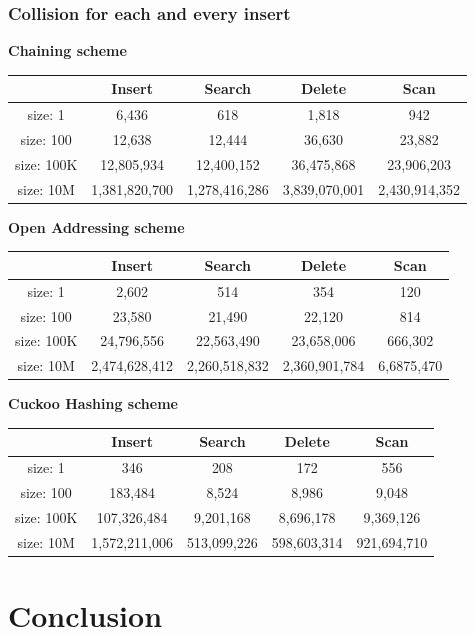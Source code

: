 \documentclass{article} %
\begin{document}
    \subsubsection*{Collision for each and every insert}
    \textbf{Chaining scheme}
    \begin{center}
        \begin{tabular}{|c|c|c|c|c|}\hline
        & Insert & Search & Delete & Scan\\\hline
        size: 1 & 6,436 & 618 & 1,818 & 942\\\hline
        size: 100 & 12,638 & 12,444 & 36,630 & 23,882\\\hline
        size: 100K & 12,805,934 & 12,400,152 & 36,475,868 & 23,906,203\\\hline
        size: 10M & 1,381,820,700 & 1,278,416,286 & 3,839,070,001 & 2,430,914,352\\\hline
        \end{tabular}
    \end{center}

    \textbf{Open Addressing scheme}
    \begin{center}
        \begin{tabular}{|c|c|c|c|c|}\hline
        & Insert & Search & Delete & Scan\\\hline
        size: 1 & 2,602 & 514 & 354 & 120\\\hline
        size: 100 & 23,580 & 21,490 & 22,120 & 814\\\hline
        size: 100K & 24,796,556 & 22,563,490 & 23,658,006 & 666,302\\\hline
        size: 10M & 2,474,628,412 & 2,260,518,832 & 2,360,901,784 & 6,6875,470\\\hline
        \end{tabular}
    \end{center}


    \textbf{Cuckoo Hashing scheme}
    \begin{center}
        \begin{tabular}{|c|c|c|c|c|}\hline
        & Insert & Search & Delete & Scan\\\hline
        size: 1 & 346 & 208 & 172 & 556\\\hline
        size: 100 & 183,484 & 8,524 & 8,986 & 9,048\\\hline
        size: 100K & 107,326,484 & 9,201,168 & 8,696,178 & 9,369,126\\\hline
        size: 10M & 1,572,211,006 & 513,099,226 & 598,603,314 & 921,694,710\\\hline
        \end{tabular}
    \end{center}

    \section*{Conclusion}
\end{document}
